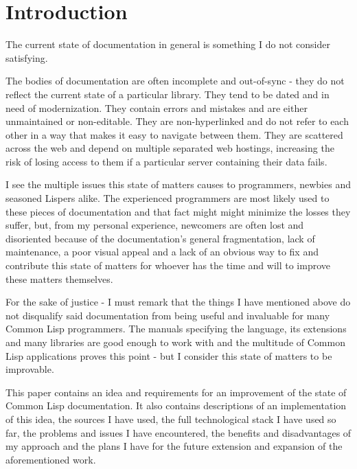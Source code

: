 \section{Introduction}

The current state of \cl{} documentation in general is something I do not consider satisfying.

The bodies of documentation are often incomplete and out-of-sync - they do not reflect the current state of a particular library. They tend to be dated and in need of modernization. They contain errors and mistakes and are either unmaintained or non-editable. They are non-hyperlinked and do not refer to each other in a way that makes it easy to navigate between them. They are scattered across the web and depend on multiple separated web hostings, increasing the risk of losing access to them if a particular server containing their data fails.

I see the multiple issues this state of matters causes to \cl{} programmers, newbies and seasoned Lispers alike. The experienced programmers are most likely used to these pieces of documentation and that fact might might minimize the losses they suffer, but, from my personal experience, newcomers are often lost and disoriented because of the documentation's general fragmentation, lack of maintenance, a poor visual appeal and a lack of an obvious way to fix and contribute this state of matters for whoever has the time and will to improve these matters themselves.

For the sake of justice - I must remark that the things I have mentioned above do not disqualify said documentation from being useful and invaluable for many Common Lisp programmers. The manuals specifying the language, its extensions and many libraries are good enough to work with and the multitude of Common Lisp applications proves this point - but I consider this state of matters to be improvable.

This paper contains an idea and requirements for an improvement of the state of Common Lisp documentation. It also contains descriptions of an implementation of this idea, the sources I have used, the full technological stack I have used so far, the problems and issues I have encountered, the benefits and disadvantages of my approach and the plans I have for the future extension and expansion of the aforementioned work.
